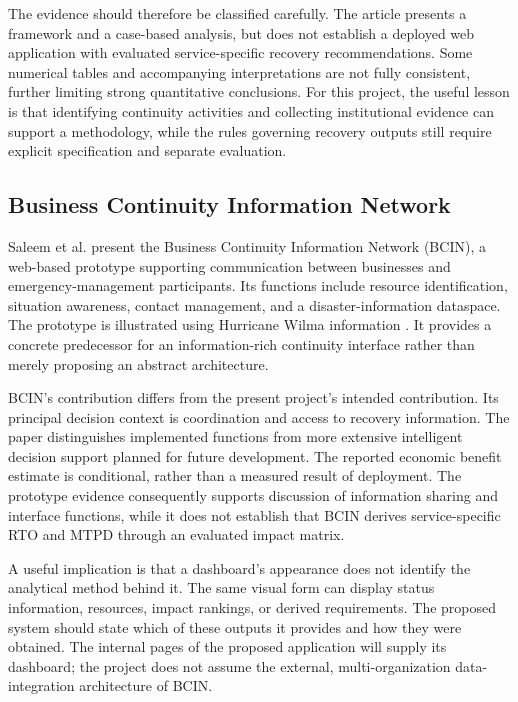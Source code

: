 The evidence should therefore be classified carefully. The article presents a framework and a case-based analysis, but does not establish a deployed web application with evaluated service-specific recovery recommendations. Some numerical tables and accompanying interpretations are not fully consistent, further limiting strong quantitative conclusions. For this project, the useful lesson is that identifying continuity activities and collecting institutional evidence can support a methodology, while the rules governing recovery outputs still require explicit specification and separate evaluation.

\subsection{Business Continuity Information Network}

Saleem et al. present the Business Continuity Information Network (BCIN), a web-based prototype supporting communication between businesses and emergency-management participants. Its functions include resource identification, situation awareness, contact management, and a disaster-information dataspace. The prototype is illustrated using Hurricane Wilma information \cite{saleem2008bcin}. It provides a concrete predecessor for an information-rich continuity interface rather than merely proposing an abstract architecture.

BCIN's contribution differs from the present project's intended contribution. Its principal decision context is coordination and access to recovery information. The paper distinguishes implemented functions from more extensive intelligent decision support planned for future development. The reported economic benefit estimate is conditional, rather than a measured result of deployment. The prototype evidence consequently supports discussion of information sharing and interface functions, while it does not establish that BCIN derives service-specific RTO and MTPD through an evaluated impact matrix.

A useful implication is that a dashboard's appearance does not identify the analytical method behind it. The same visual form can display status information, resources, impact rankings, or derived requirements. The proposed system should state which of these outputs it provides and how they were obtained. The internal pages of the proposed application will supply its dashboard; the project does not assume the external, multi-organization data-integration architecture of BCIN.

